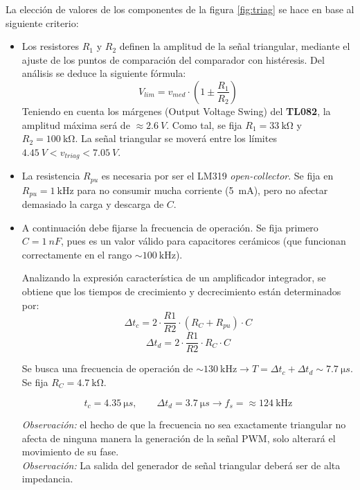 \documentclass[]{article}
\begin{document}
	La elección de valores de los componentes de la figura \ref{fig:triag} se hace en base al siguiente criterio:
	
	\begin{itemize}
		\item Los resistores $R_1$ y $R_2$ definen la amplitud de la señal triangular, mediante el ajuste de los puntos de comparación del comparador con histéresis. Del análisis se deduce la siguiente fórmula:
		\begin{equation}
			V_{lim} = v_{med} \cdot \left( 1 \pm \frac{R_1}{R_2} \right)
		\end{equation}
		Teniendo en cuenta los márgenes (Output Voltage Swing) del \textbf{TL082}, la amplitud máxima será de $\approx \SI{2.6}{V}$. Como tal, se fija $R_1 = \SI{33}{\kilo\ohm}$ y $R_2 = \SI{100}{\kilo\ohm}$. La señal triangular se moverá entre los límites $\SI{4.45}{V} < v_{triag} < \SI{7.05}{V}$.
		
		\item La resistencia $R_{pu}$ es necesaria por ser el LM319 \textit{open-collector}. Se fija en $R_{pu} = \SI{1}{\kilo\hertz}$ para no consumir mucha corriente (\SI{5}{mA}), pero no afectar demasiado la carga y descarga de $C$.
		
		\item A continuación debe fijarse la frecuencia de operación. Se fija primero $C = \SI{1}{nF}$, pues es un valor válido para capacitores cerámicos (que funcionan correctamente en el rango $\sim \SI{100}{\kilo\hertz}$).
		
		Analizando la expresión característica de un amplificador integrador, se obtiene que los tiempos de crecimiento y decrecimiento están determinados por:
		\begin{equation}
			\Delta t_c = 2 \cdot \frac{R1}{R2} \cdot (R_C + R_{pu}) \cdot C
		\end{equation}
		\begin{equation}
			\Delta t_d = 2 \cdot \frac{R1}{R2} \cdot R_C \cdot C
		\end{equation}
		
		Se busca una frecuencia de operación de $\sim \SI{130}{\kilo\hertz} \to T = \Delta t_c + \Delta t_d \sim \SI{7.7}{\micro s}$.
		Se fija $R_{C} = \SI{4.7}{\kilo\ohm}$.
		
		\begin{equation}
			t_c = \SI{4.35}{\micro s}, \qquad \Delta t_d = \SI{3.7}{\micro s} \to f_s =\approx \SI{124}{\kilo\hertz}
		\end{equation}
		
		\textit{Observación:} el hecho de que la frecuencia no sea exactamente triangular no afecta de ninguna manera la generación de la señal PWM, solo alterará el movimiento de su fase.\\
		\textit{Observación:} La salida del generador de señal triangular deberá ser de alta impedancia.
	\end{itemize}
	
\end{document}
